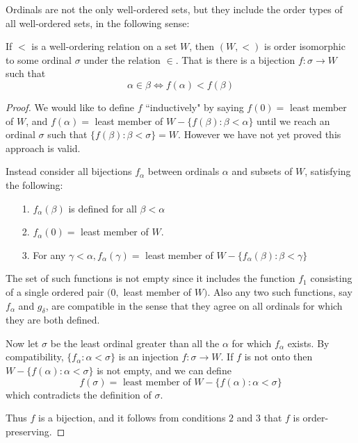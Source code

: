 \documentclass[12pt, a4paper, oneside, openright, titlepage]{book}
\begin{document}
Ordinals are not the only well-ordered sets, but they include the order types of all well-ordered sets, in the following sense: 
\begin{thm}
    If $<$ is a well-ordering relation on a set $W$, then $(W,<)$ is order isomorphic to some ordinal $\sigma$ under the relation $\in$. That is there is a bijection $f:\sigma\rightarrow W$ such that $$\alpha \in \beta \iff f(\alpha) < f(\beta)$$
\end{thm}
\begin{proof}
    We would like to define $f$ ``inductively" by saying $f(0) = $ least member of $W$, and $f(\alpha) = $ least member of $W-\{f(\beta):\beta <\alpha\}$ until we reach an ordinal $\sigma$ such that $\{f(\beta):\beta < \sigma\}  = W$. However we have not yet proved this approach is valid.

    Instead consider all bijections $f_{\alpha}$ between ordinals $\alpha$ and subsets of $W$, satisfying the following: \begin{itemize}
        \item[1.] $f_{\alpha}(\beta)$ is defined for all $\beta < \alpha$
        \item[2.] $f_{\alpha}(0) = $ least member of $W$.
        \item[3.] For any $\gamma < \alpha, f_{\alpha}(\gamma) = $ least member of $W-\{f_{\alpha}(\beta):\beta < \gamma\}$
    \end{itemize}
    The set of such functions is not empty since it includes the function $f_1$ consisting of a single ordered pair $(0, $ least member of $W)$.
    Also any two such functions, say $f_{\alpha}$ and $g_{\delta}$, are compatible in the sense that they agree on all ordinals for which they are both defined.

    Now let $\sigma$ be the least ordinal greater than all the $\alpha$ for which $f_{\alpha}$ exists. By compatibility, $\{f_{\alpha}:\alpha < \sigma\}$ is an injection $f:\sigma\rightarrow W$. If $f$ is not onto then $W-\{f(\alpha):\alpha < \sigma\}$ is not empty, and we can define \begin{equation*}
        f(\sigma) = \text{ least member of }W - \{f(\alpha):\alpha < \sigma\}
    \end{equation*}
    which contradicts the definition of $\sigma$.

    Thus $f$ is a bijection, and it follows from conditions $2$ and $3$ that $f$ is order-preserving.
\end{proof}
\end{document}
